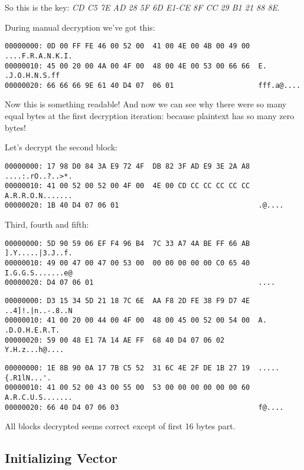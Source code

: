 So this is the key: \emph{CD C5 7E AD 28 5F 6D E1-CE 8F CC 29 B1 21 88 8E}.

During manual decryption we've got this:

\begin{lstlisting}
00000000: 0D 00 FF FE 46 00 52 00  41 00 4E 00 4B 00 49 00  ....F.R.A.N.K.I.
00000010: 45 00 20 00 4A 00 4F 00  48 00 4E 00 53 00 66 66  E. .J.O.H.N.S.ff
00000020: 66 66 66 9E 61 40 D4 07  06 01                    fff.a@....
\end{lstlisting}

Now this is something readable!
And now we can see why there were so many equal bytes at the first decryption iteration:
because plaintext has so many zero bytes!

Let's decrypt the second block:

\begin{lstlisting}
00000000: 17 98 D0 84 3A E9 72 4F  DB 82 3F AD E9 3E 2A A8  ....:.rO..?..>*.
00000010: 41 00 52 00 52 00 4F 00  4E 00 CD CC CC CC CC CC  A.R.R.O.N.......
00000020: 1B 40 D4 07 06 01                                 .@....
\end{lstlisting}

Third, fourth and fifth:

\begin{lstlisting}
00000000: 5D 90 59 06 EF F4 96 B4  7C 33 A7 4A BE FF 66 AB  ].Y.....|3.J..f.
00000010: 49 00 47 00 47 00 53 00  00 00 00 00 00 C0 65 40  I.G.G.S.......e@
00000020: D4 07 06 01                                       ....
\end{lstlisting}

\begin{lstlisting}
00000000: D3 15 34 5D 21 18 7C 6E  AA F8 2D FE 38 F9 D7 4E  ..4]!.|n..-.8..N
00000010: 41 00 20 00 44 00 4F 00  48 00 45 00 52 00 54 00  A. .D.O.H.E.R.T.
00000020: 59 00 48 E1 7A 14 AE FF  68 40 D4 07 06 02        Y.H.z...h@....
\end{lstlisting}

\begin{lstlisting}
00000000: 1E 8B 90 0A 17 7B C5 52  31 6C 4E 2F DE 1B 27 19  .....{.R1lN...'.
00000010: 41 00 52 00 43 00 55 00  53 00 00 00 00 00 00 60  A.R.C.U.S.......
00000020: 66 40 D4 07 06 03                                 f@....
\end{lstlisting}

All blocks decrypted seems correct except of first 16 bytes part.

\subsection{Initializing Vector}

